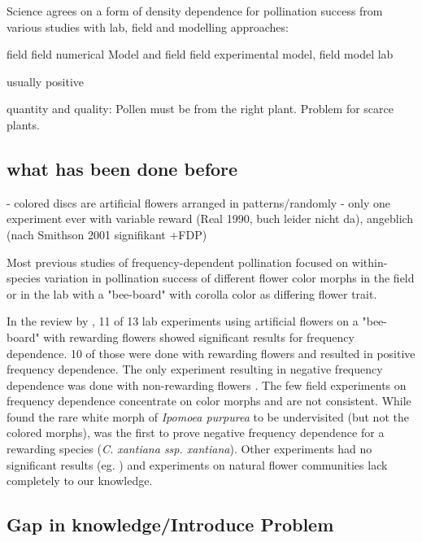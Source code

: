 Science agrees on a form of density dependence for pollination success from various studies with lab, field and modelling approaches:
	
	\citep{bernhardt2008effects} field
	\citep{elliott2009effects} field
	\citep{essenberg2012explaining} numerical Model and field
	\citep{Kunin1997} field
	\citep{kunin1993sex} experimental
	\citep{morris2010benefit} model, field
	\citep{rands2010effects} model
	\citep{stout1998influence} lab
	
usually positive
	
	
quantity and quality: Pollen must be from the right plant. Problem for scarce plants. 

\subsection*{what has been done before}

- colored discs are artificial flowers arranged in patterns/randomly
- only one experiment ever with variable reward (Real 1990, buch leider nicht da), angeblich (nach Smithson 2001 signifikant +FDP)

Most previous studies of frequency-dependent pollination focused on within-species variation in pollination success of different flower color morphs in the field or in the lab with a "bee-board" with corolla color as differing flower trait. 

In the review by \cite{smithson2001pollinator}, 11 of 13 lab experiments using artificial flowers on a "bee-board" with rewarding flowers showed significant results for frequency dependence. 10 of those were done with rewarding flowers and resulted in positive frequency dependence. The only experiment resulting in negative frequency dependence was done with non-rewarding flowers \citep{smithson1997negative}. The few field experiments on frequency dependence concentrate on color morphs and are not consistent. While \cite{epperson1987frequency} found the rare white morph of \textit{Ipomoea purpurea} to be undervisited (but not the colored morphs), \cite{Eckhart2006frequency} was the first to prove negative frequency dependence for a rewarding species (\textit{C. xantiana ssp. xantiana}). Other experiments had no significant results (eg. \citealt{jones1996pollinator}) and experiments on natural flower communities lack completely to our knowledge. 


\subsection*{Gap in knowledge/Introduce Problem}

